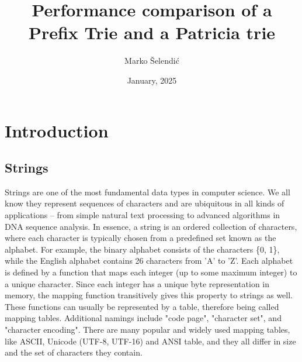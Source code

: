 \documentclass[essay]{fer}
\title{Performance comparison of a Prefix Trie and a Patricia trie}
\author{Marko Šelendić}
\date{January, 2025}
\begin{document}
\maketitle


\tableofcontents
\thispagestyle{empty}


\mainmatter







\chapter{Introduction}
\label{chptr:introduction}

\section{Strings}

Strings are one of the most fundamental data types in computer science. We all know they represent sequences of characters and are ubiquitous in all kinds of applications – from simple natural text processing to advanced algorithms in DNA sequence analysis. In essence, a string is an ordered collection of characters, where each character is typically chosen from a predefined set known as the alphabet. For example, the binary alphabet consists of the characters \{0, 1\}, while the English alphabet contains 26 characters from 'A' to 'Z'.
Each alphabet is defined by a function that maps each integer (up to some maximum integer) to a unique character. Since each integer has a unique byte representation in memory, the mapping function transitively gives this property to strings as well. These functions can usually be represented by a table, therefore being called mapping tables. Additional namings include "code page", "character set", and "character encoding". There are many popular and widely used mapping tables, like ASCII, Unicode (UTF-8, UTF-16) and ANSI table, and they all differ in size and the set of characters they contain. 
\end{document}
